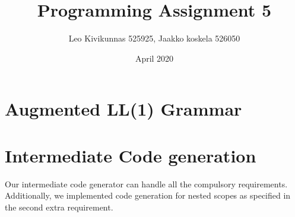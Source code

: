 \documentclass{article}
\title{Programming Assignment 5}
\author{Leo Kivikunnas 525925, Jaakko koskela 526050}
\date{April 2020}
\begin{document}
\maketitle

\section{Augmented LL(1) Grammar}



\section{Intermediate Code generation}

Our intermediate code generator can handle all the compulsory
requirements. Additionally, we implemented code generation for
nested scopes as specified in the second extra requirement.
\end{document}

